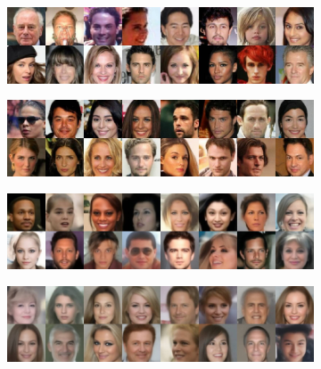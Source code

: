 \begin{figure}  [ht!]
  \begin{subfigure}{0.245\textwidth}
    \includegraphics[width=\linewidth]{figs/imgs/data_samples_diversity_0_tc.jpg}
  \end{subfigure}
  \begin{subfigure}{0.245\textwidth}
    \includegraphics[width=\linewidth]{figs/imgs/standard_sampler_samples_diversity_1000_tc.jpg}
  \end{subfigure}
  \begin{subfigure}{0.245\textwidth}
    \includegraphics[width=\linewidth]{figs/imgs/gslddim_samples_diversity_500_tc.jpg}
  \end{subfigure}
  \begin{subfigure}{0.245\textwidth}
    \includegraphics[width=\linewidth]{figs/imgs/ddim_samples_diversity_800_tc.jpg}
  \end{subfigure}  \vfill
  \begin{subfigure}{0.25\textwidth}

\end{subfigure}
\end{figure}
